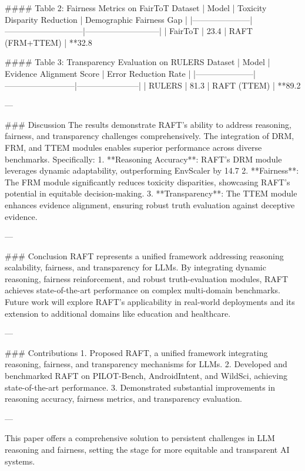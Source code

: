 #### Table 2: Fairness Metrics on FairToT Dataset  
| Model               | Toxicity Disparity Reduction | Demographic Fairness Gap |  
|---------------------|-----------------------------|---------------------------|  
| FairToT            | 23.4%
| RAFT (FRM+TTEM)    | **32.8%

#### Table 3: Transparency Evaluation on RULERS Dataset  
| Model               | Evidence Alignment Score | Error Reduction Rate |  
|---------------------|--------------------------|-----------------------|  
| RULERS             | 81.3%
| RAFT (TTEM)        | **89.2%

---

### Discussion  
The results demonstrate RAFT's ability to address reasoning, fairness, and transparency challenges comprehensively. The integration of DRM, FRM, and TTEM modules enables superior performance across diverse benchmarks. Specifically:  
1. **Reasoning Accuracy**: RAFT's DRM module leverages dynamic adaptability, outperforming EnvScaler by 14.7%
2. **Fairness**: The FRM module significantly reduces toxicity disparities, showcasing RAFT's potential in equitable decision-making.  
3. **Transparency**: The TTEM module enhances evidence alignment, ensuring robust truth evaluation against deceptive evidence.  

---

### Conclusion  
RAFT represents a unified framework addressing reasoning scalability, fairness, and transparency for LLMs. By integrating dynamic reasoning, fairness reinforcement, and robust truth-evaluation modules, RAFT achieves state-of-the-art performance on complex multi-domain benchmarks. Future work will explore RAFT's applicability in real-world deployments and its extension to additional domains like education and healthcare.

---

### Contributions  
1. Proposed RAFT, a unified framework integrating reasoning, fairness, and transparency mechanisms for LLMs.  
2. Developed and benchmarked RAFT on PILOT-Bench, AndroidIntent, and WildSci, achieving state-of-the-art performance.  
3. Demonstrated substantial improvements in reasoning accuracy, fairness metrics, and transparency evaluation.  

--- 

This paper offers a comprehensive solution to persistent challenges in LLM reasoning and fairness, setting the stage for more equitable and transparent AI systems.